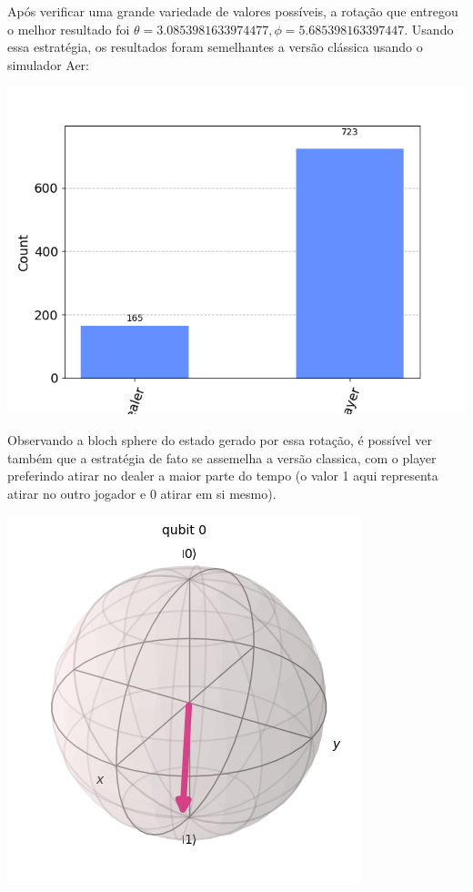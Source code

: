 \documentclass{article}
\begin{document}
Após verificar uma grande variedade de valores possíveis, a rotação que entregou o melhor resultado foi $\theta = 3.0853981633974477, \phi=5.685398163397447$.
Usando essa estratégia, os resultados foram semelhantes a versão clássica usando o simulador Aer:

\begin{center}
	\includegraphics[scale=0.6]{final_buckshot_roulette_quantum_optimal_strategy.png}
	\label{fig:bckr-circuit-result}
\end{center}

Observando a bloch sphere do estado gerado por essa rotação, é possível ver também que a estratégia de fato se assemelha a versão classica, com o player preferindo atirar no dealer a maior parte do tempo (o valor 1 aqui representa atirar no outro jogador e 0 atirar em si mesmo).

\begin{center}
	\includegraphics[scale=0.6]{player_optimal_strategy_bloch.png}
	\label{fig:bckr-bloch-sphere-best-strategy}
\end{center}
\end{document}
